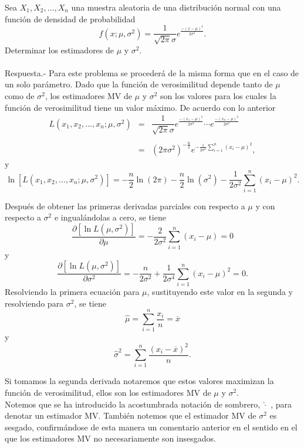 \begin{ejem}
    Sea $X_1,X_2,\ldots,X_n$ una muestra aleatoria de una distribución normal con una función de densidad de probabilidad
    $$f(x;\mu,\sigma^2)=\dfrac{1}{\sqrt{2\pi}\sigma}e^{\frac{-(x-\mu)^2}{2\sigma^2}}.$$
    Determinar los estimadores de $\mu$ y $\sigma^2$.\\\\
	Respuesta.-\; Para este problema se procederá de la misma forma que en el caso de un solo parámetro. Dado que la función de verosimilitud depende tanto de $\mu$ como de $\sigma^2$, los estimadores MV de $\mu$ y $\sigma^2$ son los valores para los cuales la función de verosimilitud tiene un valor máximo. De acuerdo con lo anterior
	$$
	\begin{array}{rcl}
	    L(x_1,x_2,\ldots,x_n;\mu,\sigma^2) &=& \dfrac{1}{\sqrt{2\pi}\sigma}e^{\frac{-(x_1-\mu)^2}{2\sigma^2}}\cdots e^{\frac{-(x_n-\mu)^2}{2\sigma^2}}\\\\
					       &=& \left(2\pi \sigma^2\right)^{-\frac{n}{2}}e^{-\frac{1}{2\sigma^2}\sum\limits_{i=1}^n(x_i-\mu)^2},
	\end{array}
	$$
	y
	$$\ln \left[L\left(x_1,x_2,\ldots,x_n;\mu,\sigma^2\right)\right]=-\dfrac{n}{2}\ln (2\pi)-\dfrac{n}{2}\ln \left(\sigma^2\right)-\dfrac{1}{2\sigma^2}\sum_{i=1}^n (x_i-\mu)^2.$$

	Después de obtener las primeras derivadas parciales con respecto a $\mu$ y con respecto a $\sigma^2$ e ingualándolas a cero, se tiene 
	$$\dfrac{\partial\left[\ln L\left(\mu,\sigma^2\right)\right]}{\partial \mu}=-\dfrac{2}{2\sigma^2}\sum_{i=1}^n (x_i-\mu)=0$$
	y
	$$\dfrac{\partial\left[\ln L\left(\mu,\sigma^2\right)\right]}{\partial \sigma^2}=-\dfrac{n}{2\sigma^2}+\dfrac{1}{2\sigma^4}\sum_{i=1}^n (x_i-\mu)^2=0.$$
	Resolviendo la primera ecuación para $\mu$, sustituyendo este valor en la segunda y resolviendo para $\sigma^2$, se tiene
	$$\hat{\mu}=\sum_{i=1}^n \dfrac{x_i}{n}=\overline{x}$$
	y
	$$\hat{\sigma}^2 = \sum_{i=1}^n \dfrac{\left(x_i-\overline{x}\right)^2}{n}.$$
\end{ejem}

Si tomamos la segunda derivada notaremos que estos valores maximizan la función de verosimilitud, ellos son los estimadores MV de $\mu$ y $\sigma^2$.\\

Notemos que se ha introducido la acostumbrada notación de sombrero, $\hat{\cdot}$ , para denotar un estimador MV. También notemos que el estimador MV de $\sigma^2$ es sesgado, confirmándose de esta manera un comentario anterior en el sentido en el que los estimadores MV no necesariamente son insesgados.\\

